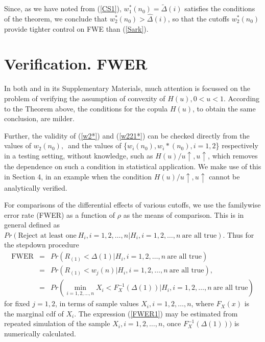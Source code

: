 \documentclass[12pt,fleqn] {article}
\begin{document}
Since, as we have noted from (\ref{CS1}), $ w_{1}^{*}(n_0)={\tilde \Delta}(i) $ satisfies the conditions of the theorem, we conclude that $ w_2^{*}(n_0)>{\hat \Delta}(i)$, so that
the cutoffs  $ w_2^{*}(n_0)$  provide tighter control  on FWE than (\ref{Sark}).

\section{Verification. FWER}




In both \cite{sarkarImprovingHolmProcedure2016}  and in its Supplementary Materials, much attention is focussed 
on the problem of verifying the assumption of convexity of $H(u), 0 < u < 1.$  According to the Theorem above, the conditions for the copula $H(u)$, to obtain the same conclusion, are milder.

Further, the validity of  (\ref{w2*}) and (\ref{w221*}) can be checked directly from the values of $w_2(n_0),$\, and the values of \{$w_i(n_0), w_i{*}(n_0), i=1,2$\} respectively in  a testing setting, without  knowledge, such as $H(u)/u \uparrow, u \uparrow$, which removes the dependence on such a condition in statistical application.
We make use of this in Section 4, in an example when the condition $H(u)/u \uparrow, u \uparrow$ cannot be analytically verified.


For comparisons of the differential effects of various cutoffs, we use  
the familywise error rate (FWER) as a function of $\rho$ as the means of comparison. This is in general defined as $Pr(\text{Reject at least one}\  H_i, i= 1,2, \ldots , n| H_i,  i= 1,2, \ldots , n \ \text{are all true})$. Thus for the stepdown procedure 
\begin{eqnarray}
\text{FWER} &= & Pr(R_{(1)} < \Delta (1)| H_i,  i= 1,2, \ldots , n \ \text{are all true}) \nonumber \\ 
&=& Pr(R_{(1)} < w_j(n)| H_i,  i= 1,2, \ldots , n \ \text{are all true}),  \nonumber\\
&=& Pr(\min_{i=1,2, \ldots , n}X_i < F_X^{-1}(\Delta (1))| H_i,  i= 1,2, \ldots , n \ \text{are all true})   \label{FWER1}
\end{eqnarray} for fixed $j=1,2$, in terms of sample values $X_i, i=1,2, \ldots , n$, where 
$F_X(x)$ is the marginal cdf of $X_i$. The expression (\ref{FWER1}) may be estimated from repeated simulation of the sample $X_i, i=1,2, \ldots , n$, once $F_X^{-1}(\Delta (1)))$ is numerically calculated.
\end{document}

